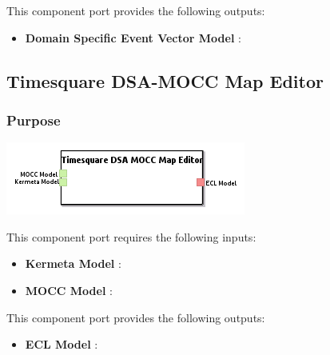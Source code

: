 \documentclass{gemoc} %
\begin{document}
This component port provides the following outputs:
\begin{itemize}
  \item \textbf{Domain Specific Event Vector Model} :
\end{itemize}


\subsection{Timesquare DSA-MOCC Map Editor}


\subsubsection{Purpose}


\begin{center}
\includegraphics*[trim=0.0cm 0.0cm 0cm 0.0cm, clip=true]{../images/generated/Generated_Timesquare_DSA-MOCC_Map_Editor.png}
\end{center}

This component port requires the following inputs:
\begin{itemize}
  \item \textbf{Kermeta Model} :
  \item \textbf{MOCC Model} :
\end{itemize}

This component port provides the following outputs:
\begin{itemize}
  \item \textbf{ECL Model} :
\end{itemize}
\end{document}
